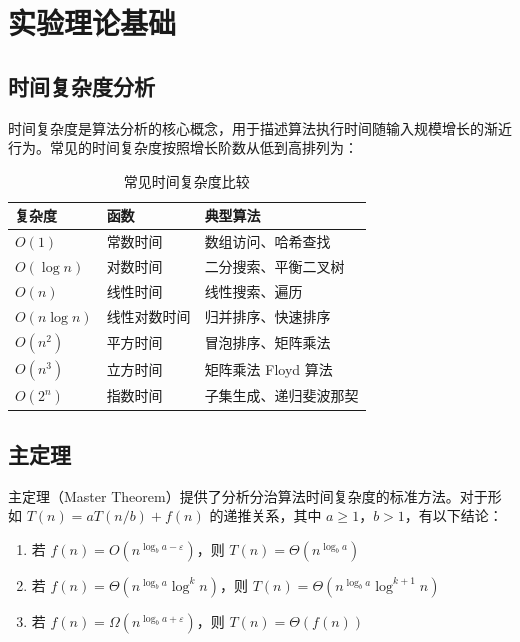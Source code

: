 \documentclass[12pt,a4paper,UTF8]{article}
\begin{document}
\section{实验理论基础}

\subsection{时间复杂度分析}

时间复杂度是算法分析的核心概念，用于描述算法执行时间随输入规模增长的渐近行为。常见的时间复杂度按照增长阶数从低到高排列为：

\begin{table}[H]
    \centering
    \caption{常见时间复杂度比较}
    \begin{tabular}{p{3cm}p{5cm}p{4cm}}
        \toprule
        \textbf{复杂度} & \textbf{函数} & \textbf{典型算法} \\
        \midrule
        $O(1)$ & 常数时间 & 数组访问、哈希查找 \\
        $O(\log n)$ & 对数时间 & 二分搜索、平衡二叉树 \\
        $O(n)$ & 线性时间 & 线性搜索、遍历 \\
        $O(n\log n)$ & 线性对数时间 & 归并排序、快速排序 \\
        $O(n^2)$ & 平方时间 & 冒泡排序、矩阵乘法 \\
        $O(n^3)$ & 立方时间 & 矩阵乘法 Floyd 算法 \\
        $O(2^n)$ & 指数时间 & 子集生成、递归斐波那契 \\
        \bottomrule
    \end{tabular}
\end{table}

\subsection{主定理}

主定理（Master Theorem）提供了分析分治算法时间复杂度的标准方法。对于形如 $T(n) = aT(n/b) + f(n)$ 的递推关系，其中 $a \geq 1$，$b > 1$，有以下结论：

\begin{enumerate}
    \item 若 $f(n) = O(n^{\log_b a - \varepsilon})$，则 $T(n) = \Theta(n^{\log_b a})$
    \item 若 $f(n) = \Theta(n^{\log_b a} \log^k n)$，则 $T(n) = \Theta(n^{\log_b a} \log^{k+1} n)$
    \item 若 $f(n) = \Omega(n^{\log_b a + \varepsilon})$，则 $T(n) = \Theta(f(n))$
\end{enumerate}
\end{document}

